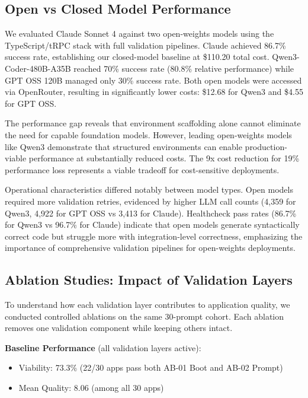 \documentclass{article}
\begin{document}
\subsection{Open vs Closed Model Performance}

We evaluated Claude Sonnet 4 against two open-weights models using the TypeScript/tRPC stack with full validation pipelines. Claude achieved 86.7\% success rate, establishing our closed-model baseline at \$110.20 total cost. Qwen3-Coder-480B-A35B reached 70\% success rate (80.8\% relative performance) while GPT OSS 120B managed only 30\% success rate. Both open models were accessed via OpenRouter, resulting in significantly lower costs: \$12.68 for Qwen3 and \$4.55 for GPT OSS.

The performance gap reveals that environment scaffolding alone cannot eliminate the need for capable foundation models. However, leading open-weights models like Qwen3 demonstrate that structured environments can enable production-viable performance at substantially reduced costs. The 9x cost reduction for 19\% performance loss represents a viable tradeoff for cost-sensitive deployments.

Operational characteristics differed notably between model types. Open models required more validation retries, evidenced by higher LLM call counts (4,359 for Qwen3, 4,922 for GPT OSS vs 3,413 for Claude). Healthcheck pass rates (86.7\% for Qwen3 vs 96.7\% for Claude) indicate that open models generate syntactically correct code but struggle more with integration-level correctness, emphasizing the importance of comprehensive validation pipelines for open-weights deployments.

\subsection{Ablation Studies: Impact of Validation Layers}

To understand how each validation layer contributes to application quality, we conducted controlled ablations on the same 30-prompt cohort. Each ablation removes one validation component while keeping others intact.

\textbf{Baseline Performance} (all validation layers active):
\begin{itemize}
\item Viability: 73.3\% (22/30 apps pass both AB-01 Boot and AB-02 Prompt)
\item Mean Quality: 8.06 (among all 30 apps)
\end{itemize}
\end{document}

